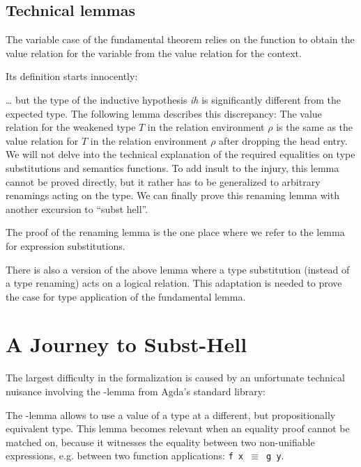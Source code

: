 \documentclass[acmsmall,anonymous,review,screen]{acmart}
\begin{document}
\subsection{Technical lemmas}
\label{sec:technical-lemmas}

The variable case of the fundamental theorem relies on the function
{\AGLookup} to obtain the value relation for the variable from the
value relation for the context. 
\LRVrenMCGLookupType

Its definition starts innocently:
\LRVrenMCGLookupBody

{\dots} but the type of the inductive hypothesis \textit{ih} is
significantly different from the expected type.
The following lemma describes this discrepancy: The value relation for
the weakened type $T$ in the relation environment $\rho$ is the same
as the value relation for $T$ in the relation environment $\rho$ after
dropping the head entry. We will not delve into the technical
explanation of the required equalities on type substitutions and
semantics functions.
\LRVrenLRVwk
To add insult to the injury, this lemma cannot be proved directly, but
it rather has to be generalized to arbitrary renamings acting on the
type.
We can finally prove this renaming lemma with another excursion to
``subst hell''.
\LRVrenLRVrenEqType

The proof of the renaming lemma is the one place where we refer to the
lemma {\AFusionESubESub} for expression substitutions.

There is also a version {\ALRVsub} of the above lemma where a type substitution
(instead of a type renaming) acts on a logical relation. This
adaptation is needed to prove the case for type application of the
fundamental lemma.

\section{A Journey to Subst-Hell}
\label{sec:subst-hell}

The largest difficulty in the formalization is caused by an unfortunate
technical nuisance involving the {\Asubst}-lemma from Agda's standard library:

\SubstExamplesDef

The {\Asubst}-lemma allows to use a value of a type at a different,
but propositionally equivalent type.
This lemma becomes relevant when an equality proof cannot be matched
on, because it witnesses the equality between two non-unifiable
expressions, e.g. between two function applications: \texttt{f x $\equiv$ g y}.
\end{document}
